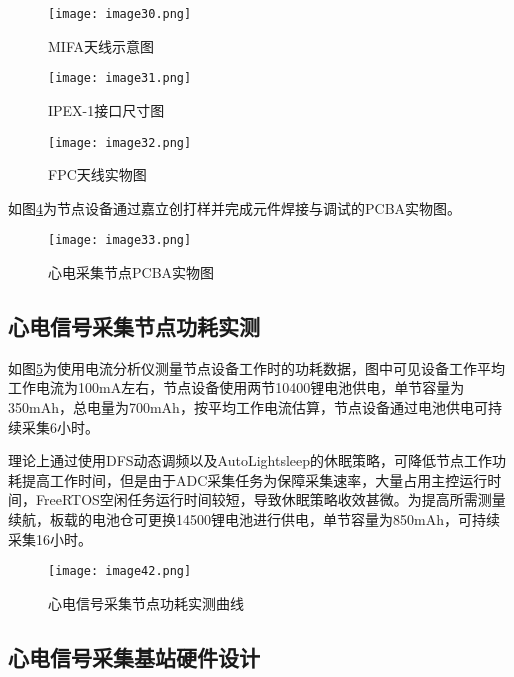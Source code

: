 \begin{figure}[htb]
    \centering
    \texttt{[image: image30.png]}
    \caption{MIFA天线示意图}
    \label{F.ECG_image30}
\end{figure}

\begin{figure}[htb]
    \centering
    \texttt{[image: image31.png]}
    \caption{IPEX-1接口尺寸图\cite{IPEX-1}}
    \label{F.ECG_image31}
\end{figure}

\begin{figure}[H]
    \centering
    \texttt{[image: image32.png]}
    \caption{FPC天线实物图}
    \label{F.ECG_image32}
\end{figure}

如图\ref{F.ECG_image33}为节点设备通过嘉立创打样并完成元件焊接与调试的PCBA实物图。

\begin{figure}[htb]
    \centering
    \texttt{[image: image33.png]}
    \caption{心电采集节点PCBA实物图}
    \label{F.ECG_image33}
\end{figure}

\subsection{心电信号采集节点功耗实测}

如图\ref{F.ECG_image42}为使用电流分析仪测量节点设备工作时的功耗数据，图中可见设备工作平均工作电流为100mA左右，节点设备使用两节10400锂电池供电，单节容量为350mAh，总电量为700mAh，按平均工作电流估算，节点设备通过电池供电可持续采集6小时。

理论上通过使用DFS动态调频以及AutoLightsleep的休眠策略，可降低节点工作功耗提高工作时间，但是由于ADC采集任务为保障采集速率，大量占用主控运行时间，FreeRTOS空闲任务运行时间较短，导致休眠策略收效甚微。为提高所需测量续航，板载的电池仓可更换14500锂电池进行供电，单节容量为850mAh，可持续采集16小时。

\begin{figure}[htb]
    \centering
    \texttt{[image: image42.png]}
    \caption{心电信号采集节点功耗实测曲线}
    \label{F.ECG_image42}
\end{figure}

\subsection{心电信号采集基站硬件设计}

